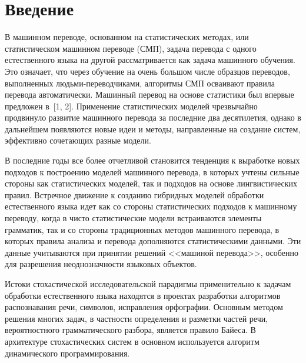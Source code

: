       \begin{multicols}{2}
      
            \label{st\stat}

\section{Введение}
     
     В машинном переводе, основанном на статистических методах, или 
статистическом машинном переводе (СМП), задача перевода с одного 
естественного языка на другой рассматривается как задача машинного 
обучения. Это означает, что через обучение на очень большом числе 
образцов переводов, выполненных людьми-переводчиками, алгоритмы СМП 
осваивают правила перевода автоматически. Машинный перевод на основе 
статистики был впервые предложен в~[1, 2]. Применение статистических 
моделей чрезвычайно продвинуло развитие машинного перевода за 
последние два десятилетия, однако в дальнейшем появляются новые 
идеи и методы, направленные на создание систем, эффективно сочетающих 
разные модели. 
     
     В последние годы все более отчетливой становится тенденция к 
выработке новых подходов к построению моделей машинного перевода, в 
которых учтены сильные стороны как статистических моделей, так и 
подходов на основе лингвистических правил. Встречное движение к 
созданию гибридных моделей обработки естественного языка идет как со 
стороны статистических подходов к машинному переводу, когда в чисто 
статистические модели встраиваются элементы грамматик, так и со стороны 
традиционных методов машинного перевода, в которых правила анализа и 
перевода дополняются статистическими данными. Эти данные учитываются 
при принятии решений <<машиной перевода>>, особенно для разрешения 
неоднозначности языковых объектов.
     
     Истоки стохастической исследовательской парадигмы применительно к 
задачам обработки естественного языка находятся в проектах разработки 
алгоритмов распознавания речи, символов, ис\-прав\-ле\-ния орфографии. 
Основным методом решения многих задач, в частности определения и 
разметки частей речи, вероятностного грамматического разбора, является 
правило Байеса. В архитектуре стохастических систем в основном 
используется алгоритм динамического программирования.
     

\end{multicols}
